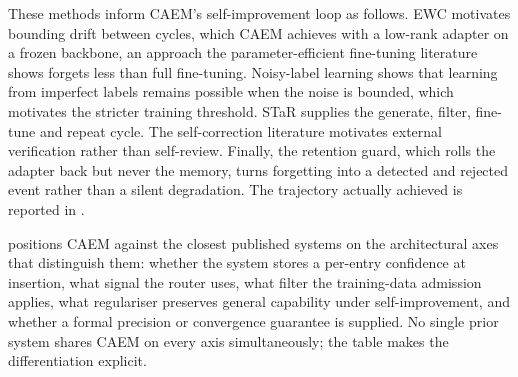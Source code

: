 These methods inform CAEM's self-improvement loop as follows. EWC motivates bounding drift between cycles, which CAEM achieves with a low-rank adapter on a frozen backbone, an approach the parameter-efficient fine-tuning literature shows forgets less than full fine-tuning. Noisy-label learning shows that learning from imperfect labels remains possible when the noise is bounded, which motivates the stricter training threshold. STaR supplies the generate, filter, fine-tune and repeat cycle. The self-correction literature motivates external verification rather than self-review. Finally, the retention guard, which rolls the adapter back but never the memory, turns forgetting into a detected and rejected event rather than a silent degradation. The trajectory actually achieved is reported in .

 positions CAEM against the closest published systems on the architectural axes that distinguish them: whether the system stores a per-entry confidence at insertion, what signal the router uses, what filter the training-data admission applies, what regulariser preserves general capability under self-improvement, and whether a formal precision or convergence guarantee is supplied. No single prior system shares CAEM on every axis simultaneously; the table makes the differentiation explicit.

